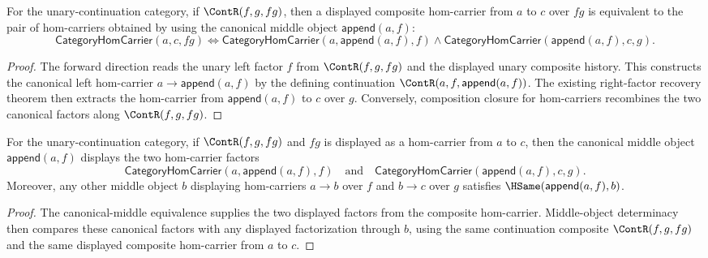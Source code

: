 \begin{theorem}
\label{thm:category-hom-carrier-comp-canonical-middle-iff}
For the unary-continuation category, if $\ContR(f,g,fg)$, then a displayed
composite hom-carrier from $a$ to $c$ over $fg$ is equivalent to the pair of
hom-carriers obtained by using the canonical middle object $\mathsf{append}(a,f)$:
$$
\mathsf{CategoryHomCarrier}(a,c,fg)
\Longleftrightarrow
\mathsf{CategoryHomCarrier}(a,\mathsf{append}(a,f),f)\wedge
\mathsf{CategoryHomCarrier}(\mathsf{append}(a,f),c,g).
$$
\end{theorem}
\begin{proof}
The forward direction reads the unary left factor $f$ from
$\ContR(f,g,fg)$ and the displayed unary composite history. This constructs
the canonical left hom-carrier $a\to\mathsf{append}(a,f)$ by the defining
continuation $\ContR(a,f,\mathsf{append}(a,f))$. The existing right-factor
recovery theorem then extracts the hom-carrier from $\mathsf{append}(a,f)$ to
$c$ over $g$. Conversely, composition closure for hom-carriers recombines the
two canonical factors along $\ContR(f,g,fg)$.
\end{proof}

\begin{theorem}
\label{thm:category-hom-carrier-comp-canonical-middle-public-readback}
For the unary-continuation category, if $\ContR(f,g,fg)$ and $fg$ is
displayed as a hom-carrier from $a$ to $c$, then the canonical middle object
$\mathsf{append}(a,f)$ displays the two hom-carrier factors
$$
\mathsf{CategoryHomCarrier}(a,\mathsf{append}(a,f),f)
\quad\text{and}\quad
\mathsf{CategoryHomCarrier}(\mathsf{append}(a,f),c,g).
$$
Moreover, any other middle object $b$ displaying hom-carriers
$a\to b$ over $f$ and $b\to c$ over $g$ satisfies
$\HSame(\mathsf{append}(a,f),b)$.
\end{theorem}
\begin{proof}
The canonical-middle equivalence supplies the two displayed factors from the
composite hom-carrier. Middle-object determinacy then compares these canonical
factors with any displayed factorization through $b$, using the same
continuation composite $\ContR(f,g,fg)$ and the same displayed composite
hom-carrier from $a$ to $c$.
\end{proof}


